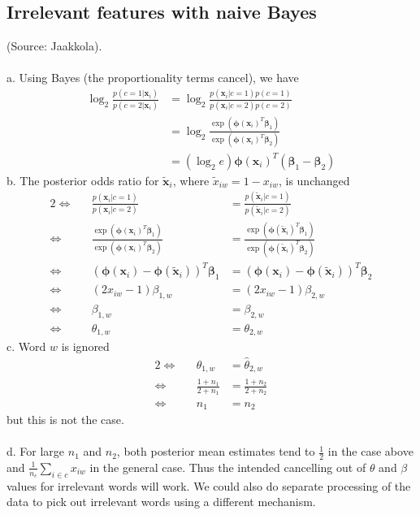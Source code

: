 \documentclass{article}
\begin{document}
\subsection{Irrelevant features with naive Bayes}
(Source: Jaakkola).\\\\
a. Using Bayes (the proportionality terms cancel), we have
\begin{align*}
\log_2\frac{p(c=1|\mathbf{x}_i)}{p(c=2|\mathbf{x}_i)} &= \log_2\frac{p(\mathbf{x}_i|c=1)p(c=1)}{p(\mathbf{x}_i|c=2)p(c=2)}\\
&= \log_2\frac{\exp(\bm\phi(\mathbf{x}_i)^T \bm\beta_1)}{\exp(\bm\phi(\mathbf{x}_i)^T \bm\beta_2)}\\
&= (\log_2e)\bm\phi(\mathbf{x}_i)^T(\bm\beta_1-\bm\beta_2)
\end{align*}
b. The posterior odds ratio for $\mathbf{\tilde{x}}_i$, where $\tilde{x}_{iw} = 1-x_{iw}$, is unchanged
\begin{alignat*}{2}
\iff&& \frac{p(\mathbf{x}_i|c=1)}{p(\mathbf{x}_i|c=2)} &= \frac{p(\mathbf{\tilde{x}}_i|c=1)}{p(\mathbf{\tilde{x}}_i|c=2)}\\
\iff&& \frac{\exp(\bm\phi(\mathbf{x}_i)^T \bm\beta_1)}{\exp(\bm\phi(\mathbf{x}_i)^T \bm\beta_2)} &= \frac{\exp(\bm\phi(\mathbf{\tilde{x}}_i)^T \bm\beta_1)}{\exp(\bm\phi(\mathbf{\tilde{x}}_i)^T \bm\beta_2)}\\
\iff&& (\bm\phi(\mathbf{x}_i)-\bm\phi(\mathbf{\tilde{x}}_i))^T \bm\beta_1 &= (\bm\phi(\mathbf{x}_i)-\bm\phi(\mathbf{\tilde{x}}_i))^T \bm\beta_2\\
\iff&& (2x_{iw}-1) \beta_{1,w} &= (2x_{iw}-1) \beta_{2,w}\\
\iff&& \beta_{1,w} &= \beta_{2,w}\\
\iff&& \theta_{1,w} &= \theta_{2,w}
\end{alignat*}
c. Word $w$ is ignored
\begin{alignat*}{2}
\iff&& \hat\theta_{1,w} &= \hat\theta_{2,w}\\
\iff&& \frac{1+n_1}{2+n_1} &= \frac{1+n_2}{2+n_2}\\
\iff&& n_1 &= n_2
\end{alignat*}
but this is not the case.\\\\
d. For large $n_1$ and $n_2$, both posterior mean estimates tend to $\frac{1}{2}$ in the case above and $\frac{1}{n_c}\sum_{i\in c}x_{iw}$ in the general case. Thus the intended cancelling out of $\theta$ and $\beta$ values for irrelevant words will work. We could also do separate processing of the data to pick out irrelevant words using a different mechanism.
\end{document}
